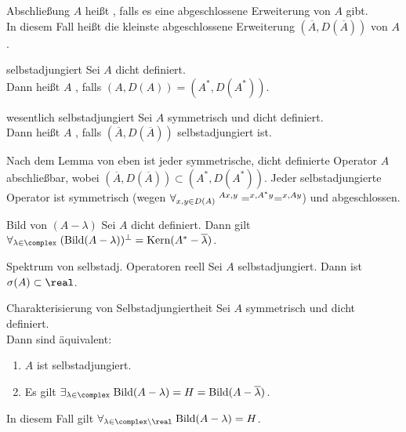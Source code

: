 \begin{Def}{Abschließung}
    $A$ heißt , falls es eine abgeschlossene Erweiterung von $A$ gibt.\\
    In diesem Fall heißt die kleinste abgeschlossene Erweiterung $(\overline{A}, D(\overline{A}))$
     von $A$.
\end{Def}

\begin{Def}{selbstadjungiert}
    Sei $A$ dicht definiert.\\
    Dann heißt $A$ , falls $(A, D(A)) = (A^\ast, D(A^\ast))$.
\end{Def}

\begin{Def}{wesentlich selbstadjungiert}
    Sei $A$ symmetrisch und dicht definiert.\\
    Dann heißt $A$ , falls
    $(\overline{A}, D(\overline{A}))$ selbstadjungiert ist.
\end{Def}

\begin{Bem}
    Nach dem Lemma von eben ist jeder symmetrische, dicht definierte Operator $A$ abschließbar,
    wobei $(\overline{A}, D(\overline{A})) \subset (A^\ast, D(A^\ast))$.
    Jeder selbstadjungierte Operator ist symmetrisch
    (wegen $\forall_{x, y \in D(A)}\; \sp{Ax, y} = \sp{x, A^\ast y} = \sp{x, Ay}$)
    und abgeschlossen.
\end{Bem}

\linie

\begin{Lemma}{Bild von $(A - \lambda)$}
    Sei $A$ dicht definiert.
    Dann gilt $\forall_{\lambda \in \complex}\;
    (\Bild(A - \lambda))^{\orth} = \Kern(A^\ast - \overline{\lambda})$.
\end{Lemma}

\begin{Satz}{Spektrum von selbstadj. Operatoren reell}
    Sei $A$ selbstadjungiert.
    Dann ist $\sigma(A) \subset \real$.
\end{Satz}

\begin{Satz}{Charakterisierung von Selbstadjungiertheit}
    Sei $A$ symmetrisch und dicht definiert.\\
    Dann sind äquivalent:
    \begin{enumerate}
        \item
        $A$ ist selbstadjungiert.
        
        \item
        Es gilt
        $\exists_{\lambda \in \complex}\; \Bild(A - \lambda) = H = \Bild(A - \overline{\lambda})$.
    \end{enumerate}
    In diesem Fall gilt $\forall_{\lambda \in \complex \setminus \real}\; \Bild(A - \lambda) = H$.
\end{Satz}

